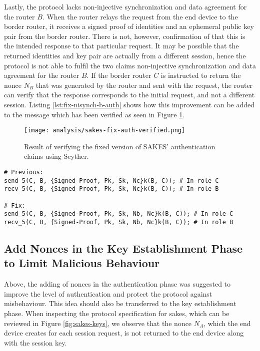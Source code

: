 Lastly, the protocol lacks non-injective synchronization and data agreement for the router $B$. When the router relays the request from the end device to the border router, it receives a signed proof of identities and an ephemeral public key pair from the border router. There is not, however, confirmation of that this is the intended response to that particular request. It may be possible that the returned identities and key pair are actually from a different session, hence the protocol is not able to fulfil the two claims non-injective synchronization and data agreement for the router $B$. If the border router $C$ is instructed to return the nonce $N_B$ that was generated by the router and sent with the request, the router can verify that the response corresponds to the initial request, and not a different session. Listing \ref{lst:fix-nisynch-b-auth} shows how this improvement can be added to the message which has been verified as seen in Figure \ref{fig:sakes-fix-auth-verified}.

\begin{figure}[H]
	\centering
	\texttt{[image: analysis/sakes-fix-auth-verified.png]}
	\caption{Result of verifying the fixed version of SAKES' authentication claims using Scyther.}
	\label{fig:sakes-fix-auth-verified}
\end{figure}


\newpage


\begin{lstlisting}[caption={Fix to the SAKES protocol to provide non-injective synchronization and data agreement for the router $B$ during the authentication phase. Changes to the protocol are highlighted in blue.}, label={lst:fix-nisynch-b-auth}, style=code-improvements-sakes-2]
# Previous:
send_5(C, B, {Signed-Proof, Pk, Sk, Nc}k(B, C)); # In role C
recv_5(C, B, {Signed-Proof, Pk, Sk, Nc}k(B, C)); # In role B
	
# Fix:
send_5(C, B, {Signed-Proof, Pk, Sk, Nb, Nc}k(B, C)); # In role C
recv_5(C, B, {Signed-Proof, Pk, Sk, Nb, Nc}k(B, C)); # In role B
\end{lstlisting}


\subsection{Add Nonces in the Key Establishment Phase to Limit Malicious Behaviour}
\label{subsec:key-establish-nonce-fix}

Above, the adding of nonces in the authentication phase was suggested to improve the level of authentication and protect the protocol against misbehaviour. This idea should also be transferred to the key establishment phase. When inspecting the protocol specification for \gls{sakes}, which can be reviewed in Figure \ref{fig:sakes-keys}, we observe that the nonce $N_A$, which the end device creates for each session request, is not returned to the end device along with the session key.

